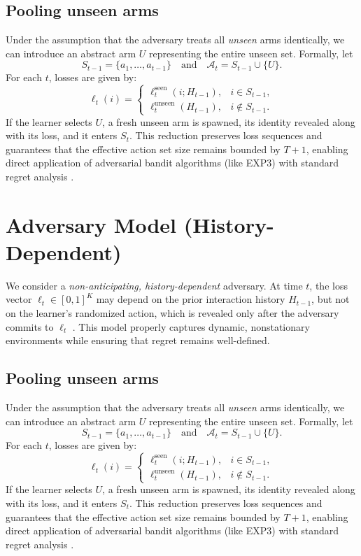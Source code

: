 \documentclass[10pt,twocolumn]{article}
\theoremstyle{definition}
\theoremstyle{remark}
\begin{document}
\subsection{Pooling unseen arms}

Under the assumption that the adversary treats all \emph{unseen} arms identically, we can introduce an abstract arm \(U\) representing the entire unseen set. Formally, let
\[
  S_{t-1} = \{a_1, \ldots, a_{t-1}\}
  \quad\text{and}\quad
  \mathcal{A}_t = S_{t-1} \cup \{U\}.
\]
For each \(t\), losses are given by:
\[
  \ell_t(i) =
  \begin{cases}
    \ell_t^{\text{seen}}(i;H_{t-1}), & i \in S_{t-1},    \\
    \ell_t^{\text{unseen}}(H_{t-1}), & i \notin S_{t-1}.
  \end{cases}
\]
If the learner selects \(U\), a fresh unseen arm is spawned, its identity revealed along with its loss, and it enters \(S_t\). This reduction preserves loss sequences and guarantees that the effective action set size remains bounded by \(T+1\), enabling direct application of adversarial bandit algorithms (like EXP3) with standard regret analysis \citep{LS20}.


\section{Adversary Model (History-Dependent)}
\label{sec:adversary}

We consider a \emph{non-anticipating, history-dependent} adversary. At time \(t\), the loss vector
\(\ell_t \in [0,1]^K\) may depend on the prior interaction history \(H_{t-1}\), but not on the learner’s randomized action, which is revealed only after the adversary commits to \(\ell_t\) \citep{LS20}. This model properly captures dynamic, nonstationary environments while ensuring that regret remains well-defined.

\subsection{Pooling unseen arms}

Under the assumption that the adversary treats all \emph{unseen} arms identically, we can introduce an abstract arm \(U\) representing the entire unseen set. Formally, let
\[
  S_{t-1} = \{a_1, \ldots, a_{t-1}\}
  \quad\text{and}\quad
  \mathcal{A}_t = S_{t-1} \cup \{U\}.
\]
For each \(t\), losses are given by:
\[
  \ell_t(i) =
  \begin{cases}
    \ell_t^{\text{seen}}(i;H_{t-1}), & i \in S_{t-1},    \\
    \ell_t^{\text{unseen}}(H_{t-1}), & i \notin S_{t-1}.
  \end{cases}
\]
If the learner selects \(U\), a fresh unseen arm is spawned, its identity revealed along with its loss, and it enters \(S_t\). This reduction preserves loss sequences and guarantees that the effective action set size remains bounded by \(T+1\), enabling direct application of adversarial bandit algorithms (like EXP3) with standard regret analysis \citep{LS20}.
\end{document}
